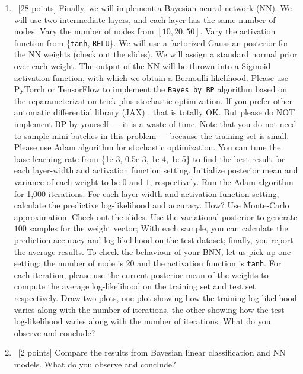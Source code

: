 \documentclass[12pt, fullpage,letterpaper]{article}
\begin{document}
\begin{enumerate}
\begin{enumerate}
		\item~[28 points] Finally, we will implement a Bayesian neural network (NN). We will use two intermediate layers, and each layer has the same number of nodes. Vary the number of nodes from $[10, 20, 50]$. Vary the activation function from \{\texttt{tanh}, \texttt{RELU}\}. 	We will use a factorized Gaussian posterior for the NN weights (check out the slides). We will assign a standard normal prior over each weight. The output of the NN will be thrown into a Sigmoid activation function, with which we obtain a Bernoulli likelihood. Please use PyTorch or TensorFlow to implement the \texttt{Bayes by BP} algorithm based on the reparameterization trick plus stochastic optimization. If you prefer other automatic differential library (\eg JAX) , that is totally OK. But please do NOT  implement BP by yourself --- it is a waste of time. Note that you do not need to sample mini-batches in this problem --- because the training set is small. Please use Adam algorithm for stochastic optimization. You can tune the base learning rate from \{1e-3, 0.5e-3, 1e-4, 1e-5\} to find the best result for each layer-width and activation function setting. Initialize posterior mean and variance of each weight to be $0$ and $1$, respectively. Run the Adam algorithm for 1,000 iterations. For each layer width and activation function setting, calculate the predictive log-likelihood and accuracy. How? Use Monte-Carlo approximation. Check out the slides.  Use the variational posterior to generate $100$ samples for the weight vector; With each sample, you can calculate the prediction accuracy and log-likelihood on the test dataset; finally, you report the average results.  To check the behaviour of your BNN, let us pick up one setting: the number of node is 20 and the activation function is \texttt{tanh}. For each iteration,  please use the current posterior mean of the weights to compute the average log-likelihood on the training set and test set respectively. Draw two plots, one plot showing how the training log-likelihood varies along with the number of iterations, the other showing how the test log-likelihood varies along with the number of iterations. What do you observe and conclude?
		
		\item~[2 points] Compare the results from Bayesian linear classification and NN models. What do you observe and conclude?
	\end{enumerate}



\end{enumerate}
\end{document}
